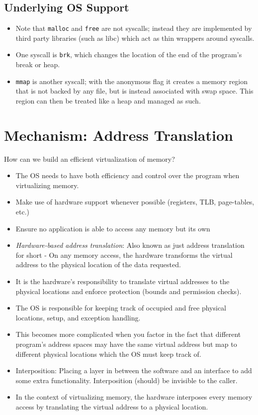 \documentclass[11pt, a4paper]{article}
\theoremstyle{definition}
\theoremstyle{remark}
\newcommand{\chap}[2]{%
  \renewcommand{\thesection}{\arabic{section}}%
  \renewcommand{\theHsection}{chap.\arabic{section}}%
  \setcounter{section}{#1}\addtocounter{section}{-1}%
  \section{#2}}
\begin{document}
\subsection{Underlying OS Support}
\begin{itemize}
  \item Note that \texttt{malloc} and \texttt{free} are not syscalls; instead they are implemented by third party libraries (such as libc) which act as thin wrappers around syscalls.
  \item One syscall is \texttt{brk}, which changes the location of the end of the program's break or heap.
  \item \texttt{mmap} is another syscall; with the anonymous flag it creates a memory region that is not backed by any file, but is instead associated with swap space. This region can then be treated like a heap and managed as such.
\end{itemize}
\chap{15}{Mechanism: Address Translation}
How can we build an efficient virtualization of memory?
\begin{itemize}
  \item The OS needs to have both efficiency and control over the program when virtualizing memory.
  \item Make use of hardware support whenever possible (registers, TLB, page-tables, etc.)
  \item Ensure no application is able to access any memory but its own
  \item \textit{Hardware-based address translation}: Also known as just address translation for short - On any memory access, the hardware transforms the virtual address to the physical location of the data requested.
  \item It is the hardware's responsibility to translate virtual addresses to the physical locations and enforce protection (bounds and permission checks).
  \item The OS is responsible for keeping track of occupied and free physical locations, setup, and exception handling.
  \item This becomes more complicated when you factor in the fact that different program's address spaces may have the same virtual address but map to different physical locations which the OS must keep track of.
  \item Interposition: Placing a layer in between the software and an interface to add some extra functionality. Interposition (should) be invisible to the caller. 
  \item In the context of virtualizing memory, the hardware interposes every memory access by translating the virtual address to a physical location.
\end{itemize}
\end{document}
